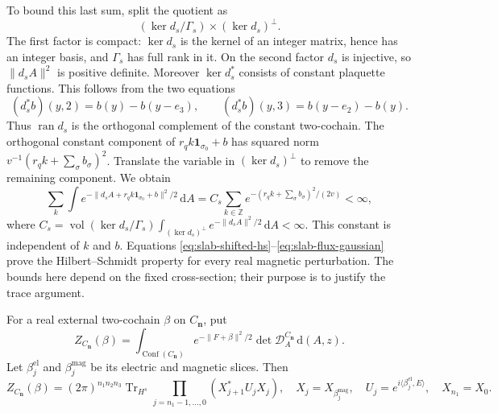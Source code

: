 \documentclass[11pt,letterpaper,reqno]{amsart}
\newcommand{\Z}{\mathbb Z}
\newcommand{\dd}{\mathrm d}
\begin{document}
To bound this last sum, split the quotient as
\[
 (\ker d_s/\Gamma_s)\times(\ker d_s)^\perp.
\]
The first factor is compact: $\ker d_s$ is the kernel of an integer
matrix, hence has an integer basis, and $\Gamma_s$ has full rank in
it. On the second factor $d_s$ is injective, so
$\|d_sA\|^2$ is positive definite. Moreover
$\ker d_s^*$ consists of constant plaquette functions. This follows
from the two equations
\[
 (d_s^*b)(y,2)=b(y)-b(y-e_3),\qquad
 (d_s^*b)(y,3)=b(y-e_2)-b(y).
\]
Thus $\operatorname{ran}d_s$ is the orthogonal complement of the
constant two-cochain. The orthogonal constant component of
$r_qk\mathbf1_{\sigma_0}+b$ has squared norm
$v^{-1}(r_qk+\sum_\sigma b_\sigma)^2$. Translate the variable in
$(\ker d_s)^\perp$ to remove the remaining component. We obtain
\begin{equation}\label{eq:slab-flux-gaussian}
 \sum_k\int e^{-\|d_sA+r_qk\mathbf1_{\sigma_0}+b\|^2/2}\,\dd A
    =C_s\sum_{k\in\Z}
               e^{-(r_qk+\sum_\sigma b_\sigma)^2/(2v)}<\infty,
\end{equation}
where
$C_s=\operatorname{vol}(\ker d_s/\Gamma_s)
\int_{(\ker d_s)^\perp}e^{-\|d_sA\|^2/2}\,\dd A<\infty$.
This constant is independent of $k$ and $b$. Equations
\eqref{eq:slab-shifted-hs}--\eqref{eq:slab-flux-gaussian} prove the
Hilbert--Schmidt property for every real magnetic perturbation. The
bounds here depend on the fixed cross-section; their purpose is to
justify the trace argument.

For a real external two-cochain $\beta$ on $C_{\mathbf n}$, put
\begin{equation}\label{eq:slab-external-partition}
 Z_{C_{\mathbf n}}(\beta)=\int_{\operatorname{Conf}(C_{\mathbf n})}
          e^{-\|F+\beta\|^2/2}\det \mathcal D_A^{C_{\mathbf n}}\,\dd(A,z).
\end{equation}
Let $\beta_j^{\mathrm{el}}$ and $\beta_j^{\mathrm{mag}}$ be its
electric and magnetic slices. Then
\begin{equation}\label{eq:slab-external-trace}
 Z_{C_{\mathbf n}}(\beta)=(2\pi)^{n_1n_2n_3}
       \operatorname{Tr}_{H^s}\prod_{j=n_1-1,\ldots,0}
            (X_{j+1}^*U_jX_j),
 \quad X_j=X_{\beta_j^{\mathrm{mag}}},\quad
 U_j=e^{i\langle\beta_j^{\mathrm{el}},E\rangle},
 \quad X_{n_1}=X_0.
\end{equation}
\end{document}
